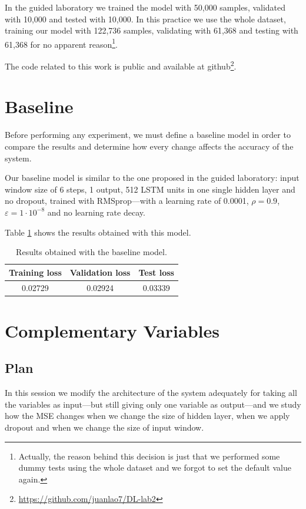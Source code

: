 \documentclass[]{article}
\begin{document}
	In the guided laboratory we trained the model with 50,000 samples, validated with 10,000 and tested with 10,000. In this practice we use the whole dataset, training our model with 122,736 samples, validating with 61,368 and testing with 61,368 for no apparent reason\footnote{Actually, the reason behind this decision is just that we performed some dummy tests using the whole dataset and we forgot to set the default value again.}.
	
	The code related to this work is public and available at github\footnote{\url{https://github.com/juanlao7/DL-lab2}}.
	
	\section{Baseline}
	
	Before performing any experiment, we must define a baseline model in order to compare the results and determine how every change affects the accuracy of the system.
	
	Our baseline model is similar to the one proposed in the guided laboratory: input window size of 6 steps, 1 output, 512 LSTM units in one single hidden layer and no dropout, trained with RMSprop---with a learning rate of 0.0001, $ \rho = 0.9 $, $ \varepsilon = 1 \cdot 10^{-8} $ and no learning rate decay.
	
	Table \ref{t:baseline} shows the results obtained with this model.
	
	\begin{table}[H]
		\centering
		\begin{tabular}{@{}ccc@{}}
			\toprule
			Training loss & Validation loss & Test loss \\ \midrule
			0.02729       & 0.02924         & 0.03339   \\ \bottomrule
		\end{tabular}
		\caption{Results obtained with the baseline model.}
		\label{t:baseline}
	\end{table}
	
	\section{Complementary Variables}
	
	\subsection{Plan}
	
	In this session we modify the architecture of the system adequately for taking all the variables as input---but still giving only one variable as output---and we study how the MSE changes when we change the size of hidden layer, when we apply dropout and when we change the size of input window.
	
\end{document}
